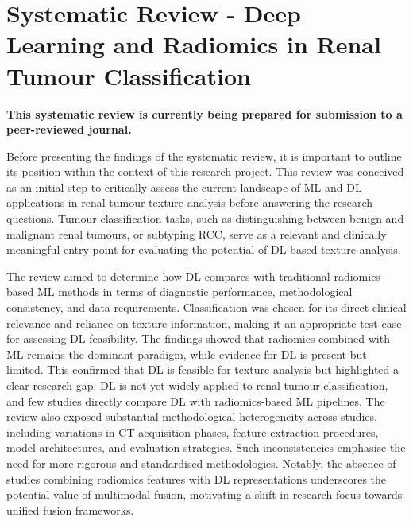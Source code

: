 \documentclass[final,british,a4paper,12pt]{phdthesis}
\begin{document}
\section{Systematic Review - Deep Learning and Radiomics in Renal Tumour Classification}
\textbf{This systematic review is currently being prepared for submission to a peer-reviewed journal.}

\vspace{2mm}

Before presenting the findings of the systematic review, it is important to outline its position within the context of this research project. This review was conceived as an initial step to critically assess the current landscape of ML and DL applications in renal tumour texture analysis before answering the research questions. Tumour classification tasks, such as distinguishing between benign and malignant renal tumours, or subtyping RCC, serve as a relevant and clinically meaningful entry point for evaluating the potential of DL-based texture analysis.


The review aimed to determine how DL compares with traditional radiomics-based ML methods in terms of diagnostic performance, methodological consistency, and data requirements. Classification was chosen for its direct clinical relevance and reliance on texture information, making it an appropriate test case for assessing DL feasibility. The findings showed that radiomics combined with ML remains the dominant paradigm, while evidence for DL is present but limited. This confirmed that DL is feasible for texture analysis but highlighted a clear research gap: DL is not yet widely applied to renal tumour classification, and few studies directly compare DL with radiomics-based ML pipelines. The review also exposed substantial methodological heterogeneity across studies, including variations in CT acquisition phases, feature extraction procedures, model architectures, and evaluation strategies. Such inconsistencies emphasise the need for more rigorous and standardised methodologies. Notably, the absence of studies combining radiomics features with DL representations underscores the potential value of multimodal fusion, motivating a shift in research focus towards unified fusion frameworks.

\end{document}
